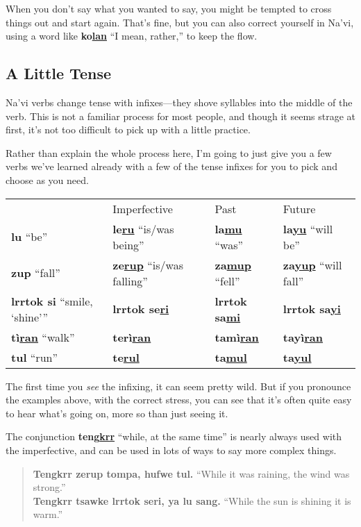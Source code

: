 \documentclass[nofonts]{tufte-handout}
\newcommand{\N}[1]{\textbf{\textcolor{navi}{#1}}}
\begin{document}
When you don't say what you wanted to say, you might be tempted to
cross things out and start again.  That's fine, but you can also
correct yourself in Na'vi, using a word like \N{ko\uline{lan}} ``I
mean, rather,'' to keep the flow.

\subsection*{A Little Tense}
Na'vi verbs change tense with infixes—they shove syllables into the
middle of the verb.  This is not a familiar process for most people,
and though it seems strage at first, it's not too difficult to pick up
with a little practice.

Rather than explain the whole process here, I'm going to just give you
a few verbs we've learned already with a few of the tense infixes for
you to pick and choose as you need. 

\medskip
\begin{tabular}{llll}
  & Imperfective & Past & Future \\
\N{lu} ``be'' & \N{le\uline{ru}} ``is/was being'' & \N{la\uline{mu}}
    ``was'' & \N{la\uline{yu}} ``will be'' \\
\N{zup} ``fall'' & \N{ze\uline{rup}} ``is/was falling'' & \N{za\uline{mup}}
    ``fell'' & \N{za\uline{yup}} ``will fall''\\
\N{lrrtok si} ``smile, `shine''' & \N{lrrtok se\uline{ri}} &
    \N{lrrtok sa\uline{mi}} & \N{lrrtok sa\uline{yi}} \\
\N{tì\uline{ran}} ``walk'' & \N{terì\uline{ran}} & \N{tamì\uline{ran}} &
    \N{tayì\uline{ran}} \\
\N{tul} ``run'' & \N{te\uline{rul}} & \N{ta\uline{mul}}
     & \N{ta\uline{yul}} 
\end{tabular}
\medskip

\noindent The first time you \textit{see} the infixing,
it can seem pretty wild.  But if you pronounce the examples above,
with the correct stress, you can see that it's often quite easy to
hear what's going on, more so than just seeing it.

The conjunction \N{teng\uline{krr}} ``while, at the same time'' is
nearly always used with the imperfective, and can be used in lots of
ways to say more complex things.

\begin{quotation}
\noindent\N{Tengkrr zerup tompa, hufwe tul.} ``While it was raining,
the wind was strong.''\\

\noindent\N{Tengkrr tsawke lrrtok seri, ya lu sang.} ``While the sun is
shining it is warm.''
\end{quotation}
\end{document}
